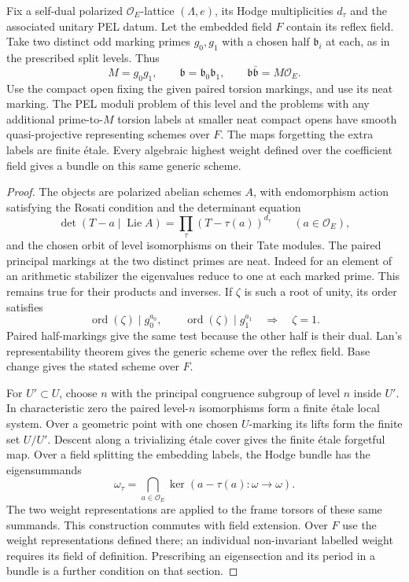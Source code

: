 \begin{auxlemma}\label{lem:marked-pel-base-levels}
Fix a self-dual polarized \(\mathcal O_E\)-lattice
\((\Lambda,e)\), its Hodge multiplicities \(d_\tau\) and the
associated unitary PEL datum. Let the embedded field \(F\) contain
its reflex field. Take two distinct odd marking primes \(g_0,g_1\)
with a chosen half \(\mathfrak b_i\) at each, as in the prescribed
split levels. Thus
\[
     M=g_0g_1,\qquad \mathfrak b=\mathfrak b_0\mathfrak b_1,\qquad
                  \mathfrak b\bar{\mathfrak b}=M\mathcal O_E .
\]
Use the compact open fixing the given paired torsion markings, and
use its neat marking. The PEL moduli problem of this level and the
problems with any additional prime-to-\(M\) torsion labels at
smaller neat compact opens have smooth quasi-projective representing
schemes over \(F\). The maps forgetting the extra labels are finite
\'etale. Every algebraic highest weight defined over the coefficient field gives
a bundle on this same generic scheme.
\end{auxlemma}
\begin{proof}
The objects are polarized abelian schemes \(A\), with endomorphism
action satisfying the Rosati condition and the determinant equation
\[
       \det(T-a\mid\operatorname{Lie}A)
                 =\prod_\tau (T-\tau(a))^{d_\tau}
                   \qquad(a\in\mathcal O_E),
\]
and the chosen orbit of level isomorphisms on their Tate modules.
The paired principal markings at the two distinct primes are neat. Indeed for an element of an arithmetic stabilizer the eigenvalues reduce to one at each marked prime. This remains true for their products and inverses. If \(\zeta\) is such a root of unity, its order satisfies
\[
        \operatorname{ord}(\zeta)\mid g_0^{a_0},\qquad
        \operatorname{ord}(\zeta)\mid g_1^{a_1}
            \quad\Longrightarrow\quad \zeta=1 .
\] Paired half-markings give the same test because the other half is their dual. Lan's representability theorem gives the generic scheme over the
reflex field. Base change gives the stated scheme over \(F\).
\cite[Section~2]{lan-ramified-models}

For \(U'\subset U\), choose \(n\) with the principal congruence
subgroup of level \(n\) inside \(U'\). In characteristic zero the
paired level-\(n\) isomorphisms form a finite \'etale local system.
Over a geometric point with one chosen \(U\)-marking its lifts form
the finite set \(U/U'\). Descent along a trivializing \'etale cover
gives the finite \'etale forgetful map.
Over a field splitting the embedding labels, the Hodge bundle has
the eigensummands
\[
          \omega_\tau=\bigcap_{a\in\mathcal O_E}
                       \ker(a-\tau(a):\omega\longrightarrow\omega).
\]
The two weight representations are applied to the frame torsors of
these same summands. This construction commutes with field
extension. Over \(F\) use the weight representations defined there;
an individual non-invariant labelled weight requires its field of
definition. Prescribing an eigensection and its period in a bundle
is a further condition on that section.
\end{proof}

